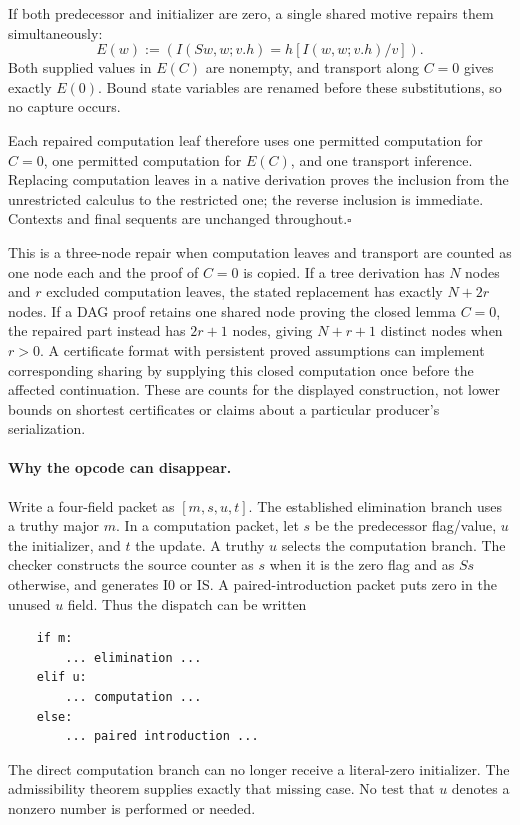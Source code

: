 \documentclass[11pt,letterpaper]{article}
\theoremstyle{definition}\newtheorem{definition}[theorem]{Definition}
\theoremstyle{remark}\newtheorem{remark}[theorem]{Remark}
\begin{document}
If both predecessor and initializer are zero, a single shared motive
repairs them simultaneously:
\[
 E(w):=\left(I(Sw,w;v.h)=h[I(w,w;v.h)/v]\right).
\]
Both supplied values in $E(C)$ are nonempty, and transport along $C=0$
gives exactly $E(0)$.  Bound state variables are renamed before these
substitutions, so no capture occurs.

Each repaired computation leaf therefore uses one permitted computation
for $C=0$, one permitted computation for $E(C)$, and one transport
inference.  Replacing computation leaves in a native derivation proves
the inclusion from the unrestricted calculus to the restricted one;
the reverse inclusion is immediate.  Contexts and final sequents are
unchanged throughout.\hfill$\square$

This is a three-node repair when computation leaves and transport are
counted as one node each and the proof of $C=0$ is copied.  If a tree
derivation has $N$ nodes and $r$ excluded computation leaves, the stated
replacement has exactly $N+2r$ nodes.  If a DAG proof retains one shared
node proving the closed lemma $C=0$, the repaired part instead has
$2r+1$ nodes, giving $N+r+1$ distinct nodes when $r>0$.  A certificate
format with persistent proved assumptions can implement corresponding
sharing by supplying this closed computation once before the affected
continuation.  These are counts for the displayed construction, not
lower bounds on shortest certificates or claims about a particular
producer's serialization.

\paragraph{Why the opcode can disappear.}
Write a four-field packet as $[m,s,u,t]$.  The established elimination
branch uses a truthy major $m$.  In a computation packet, let $s$ be the
predecessor flag/value, $u$ the initializer, and $t$ the update.  A truthy
$u$ selects the computation branch.  The checker constructs the source
counter as $s$ when it is the zero flag and as $Ss$ otherwise, and
generates I0 or IS.  A paired-introduction packet puts zero in the unused
$u$ field.  Thus the dispatch can be written
\begin{verbatim}
    if m:
        ... elimination ...
    elif u:
        ... computation ...
    else:
        ... paired introduction ...
\end{verbatim}
The direct computation branch can no longer receive a literal-zero
initializer.  The admissibility theorem supplies exactly that missing
case.  No test that $u$ denotes a nonzero number is performed or needed.
\end{document}
